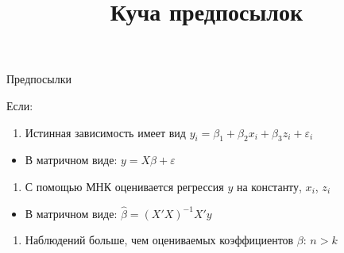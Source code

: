\documentclass[ignorenonframetext,]{beamer}
\title{Куча предпосылок}
\begin{document}
\frame{\titlepage}

\begin{frame}{Предпосылки}

Если:

\begin{enumerate}
\def\labelenumi{\arabic{enumi}.}
\itemsep1pt\parskip0pt
\item
  Истинная зависимость имеет вид
  $y_i=\beta_1 + \beta_2 x_i + \beta_3 z_i+\varepsilon_i$
\end{enumerate}

\begin{itemize}
\itemsep1pt\parskip0pt
\item
  В матричном виде: $y=X\beta + \varepsilon$
\end{itemize}

\begin{enumerate}
\def\labelenumi{\arabic{enumi}.}
\setcounter{enumi}{1}
\itemsep1pt\parskip0pt
\item
  С помощью МНК оценивается регрессия $y$ на константу, $x_i$, $z_i$
\end{enumerate}

\begin{itemize}
\itemsep1pt\parskip0pt
\item
  В матричном виде: $\hat{\beta}=(X'X)^{-1}X'y$
\end{itemize}

\begin{enumerate}
\def\labelenumi{\arabic{enumi}.}
\setcounter{enumi}{2}
\itemsep1pt\parskip0pt
\item
  Наблюдений больше, чем оцениваемых коэффициентов $\beta$: $n>k$
\end{enumerate}

\end{frame}
\end{document}
